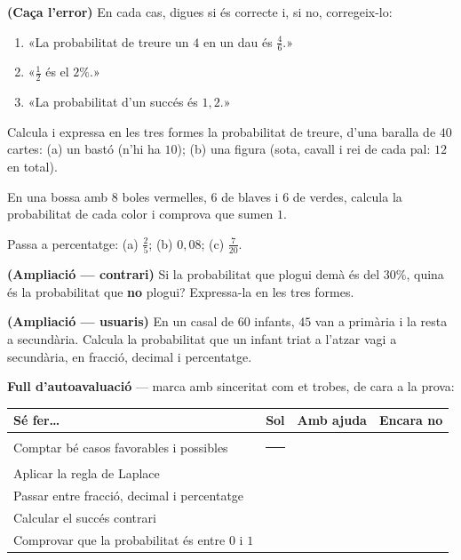 \begin{exercicis}
\begin{exlist}
  \item \textbf{(Caça l'error)} En cada cas, digues si és correcte i, si no, corregeix-lo:
    \begin{enumerate}[label=\alph*), leftmargin=1.6em, topsep=2pt]
      \item «La probabilitat de treure un $4$ en un dau és $\frac{4}{6}$.»
      \item «$\frac{1}{2}$ és el $2\%$.»
      \item «La probabilitat d'un succés és $1,2$.»
    \end{enumerate}
  \item Calcula i expressa en les tres formes la probabilitat de treure, d'una baralla
        de $40$ cartes: (a) un bastó (n'hi ha $10$); (b) una figura (sota, cavall i rei
        de cada pal: $12$ en total).
  \item En una bossa amb $8$ boles vermelles, $6$ de blaves i $6$ de verdes, calcula la
        probabilitat de cada color i comprova que sumen $1$.
  \item Passa a percentatge: (a) $\frac{2}{5}$; (b) $0,08$; (c) $\frac{7}{20}$.
  \item \textbf{(Ampliació — contrari)} Si la probabilitat que plogui demà és del $30\%$,
        quina és la probabilitat que \textbf{no} plogui? Expressa-la en les tres formes.
  \item \textbf{(Ampliació — usuaris)} En un casal de $60$ infants, $45$ van a primària i
        la resta a secundària. Calcula la probabilitat que un infant triat a l'atzar
        vagi a secundària, en fracció, decimal i percentatge.
\end{exlist}
\end{exercicis}

\begin{idea}
\textbf{Full d'autoavaluació} — marca amb sinceritat com et trobes, de cara a la prova:
\begin{center}
\renewcommand{\arraystretch}{1.4}
\begin{tabular}{p{8.2cm} c c c}
\toprule
\textbf{Sé fer\dots} & \textbf{Sol} & \textbf{Amb ajuda} & \textbf{Encara no} \\
\midrule
Comptar bé casos favorables i possibles & \rule{0.7cm}{0pt} & & \\
Aplicar la regla de Laplace & & & \\
Passar entre fracció, decimal i percentatge & & & \\
Calcular el succés contrari & & & \\
Comprovar que la probabilitat és entre $0$ i $1$ & & & \\
\bottomrule
\end{tabular}
\end{center}
\end{idea}

